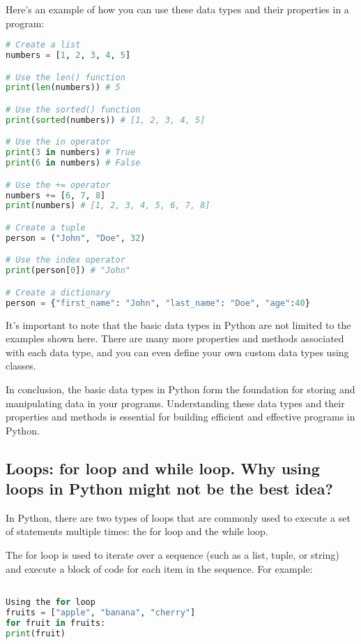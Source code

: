 \documentclass[12pt, a4paper, oneside]{article}
\begin{document}
Here's an example of how you can use these data types and their properties in a program:

\begin{lstlisting}[language=Python, frame=single]
# Create a list
numbers = [1, 2, 3, 4, 5]

# Use the len() function
print(len(numbers)) # 5

# Use the sorted() function
print(sorted(numbers)) # [1, 2, 3, 4, 5]

# Use the in operator
print(3 in numbers) # True
print(6 in numbers) # False

# Use the += operator
numbers += [6, 7, 8]
print(numbers) # [1, 2, 3, 4, 5, 6, 7, 8]

# Create a tuple
person = ("John", "Doe", 32)

# Use the index operator
print(person[0]) # "John"

# Create a dictionary
person = {"first_name": "John", "last_name": "Doe", "age":40}
\end{lstlisting}

It's important to note that the basic data types in Python are not limited to the examples shown here. There are many more properties and methods associated with each data type, and you can even define your own custom data types using classes.

In conclusion, the basic data types in Python form the foundation for storing and manipulating data in your programs. Understanding these data types and their properties and methods is essential for building efficient and effective programs in Python.
\subsection{ Loops: for loop and while loop. Why using loops in Python might not be the best idea? }
In Python, there are two types of loops that are commonly used to execute a set of statements multiple times: the for loop and the while loop.

The for loop is used to iterate over a sequence (such as a list, tuple, or string) and execute a block of code for each item in the sequence. For example:

\begin{lstlisting}[language=Python, frame=single]

Using the for loop
fruits = ["apple", "banana", "cherry"]
for fruit in fruits:
print(fruit)
\end{lstlisting}
\end{document}
